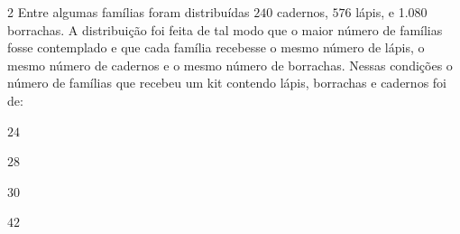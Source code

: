 

\num{2}  Entre algumas famílias foram distribuídas $240$ cadernos, $576$ lápis, e
1.080 borrachas. A distribuição foi feita de tal modo que o maior número
de famílias fosse contemplado e que cada família recebesse o mesmo
número de lápis, o mesmo número de cadernos e o mesmo número de
borrachas. Nessas condições o número de famílias que recebeu um kit
contendo lápis, borrachas e cadernos foi de:

\begin{escolha}
\item $24$
\item $28$
\item $30$
\item $42$
\end{escolha}



